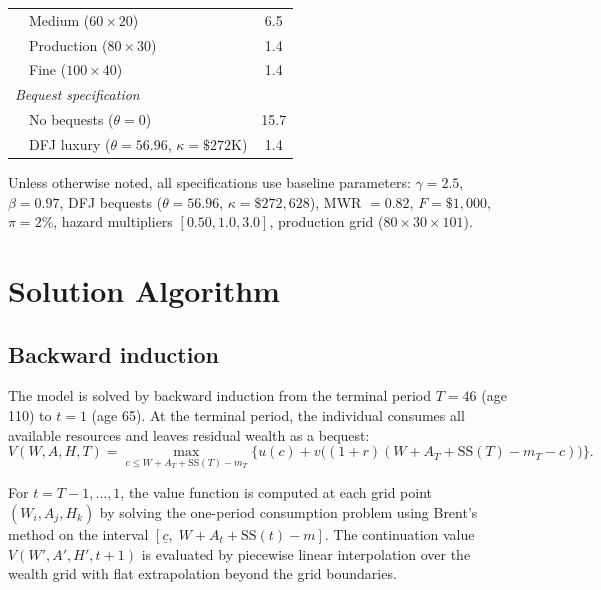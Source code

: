 \documentclass[12pt]{article}
\begin{document}
\begin{table}[htbp]
\begin{threeparttable}
\begin{tabular}{llc}
 & Medium ($60 \times 20$) & 6.5 \\
 & Production ($80 \times 30$) & 1.4 \\
 & Fine ($100 \times 40$) & 1.4 \\[4pt]
\multicolumn{3}{l}{\textit{Bequest specification}} \\
 & No bequests ($\theta = 0$) & 15.7 \\
 & DFJ luxury ($\theta = 56.96$, $\kappa = \$272$K) & 1.4 \\
\bottomrule
\end{tabular}
\begin{tablenotes}
\small
\item Unless otherwise noted, all specifications use baseline parameters: $\gamma = 2.5$, $\beta = 0.97$, DFJ bequests ($\theta = 56.96$, $\kappa = \$272{,}628$), MWR $= 0.82$, $F = \$1{,}000$, $\pi = 2\%$, hazard multipliers $[0.50, 1.0, 3.0]$, production grid ($80 \times 30 \times 101$).
\end{tablenotes}
\end{threeparttable}
\end{table}


\section{Solution Algorithm}
\label{app:algorithm}

\subsection{Backward induction}

The model is solved by backward induction from the terminal period $T = 46$ (age 110) to $t = 1$ (age 65). At the terminal period, the individual consumes all available resources and leaves residual wealth as a bequest:
\[
V(W, A, H, T) = \max_{c \leq W + A_T + \text{SS}(T) - m_T} \Big\{ u(c) + v\big((1+r)(W + A_T + \text{SS}(T) - m_T - c)\big) \Big\}.
\]

For $t = T-1, \ldots, 1$, the value function is computed at each grid point $(W_i, A_j, H_k)$ by solving the one-period consumption problem using Brent's method on the interval $[\underline{c}, \; W + A_t + \text{SS}(t) - m]$. The continuation value $V(W', A', H', t+1)$ is evaluated by piecewise linear interpolation over the wealth grid with flat extrapolation beyond the grid boundaries.
\end{document}
